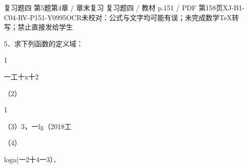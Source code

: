 \begin{bankitem}{复习题四 第5题}{第4章 / 章末复习 复习题四 / 教材 p.151 / PDF 第158页}{XJ-B1-C04-RV-P151-Y0995}{OCR未校对：公式与文字均可能有误；未完成数学TeX转写；禁止直接发给学生}
\begin{ocrdraft}
\par
5．求下列函数的定义域：
\par
1
\par
一工十x十2
\par
（2）
\par
1
\par
（3）3，一lg（2018工
\par
（4）
\par
loga(一2十4一3）．
\end{ocrdraft}
\end{bankitem}
